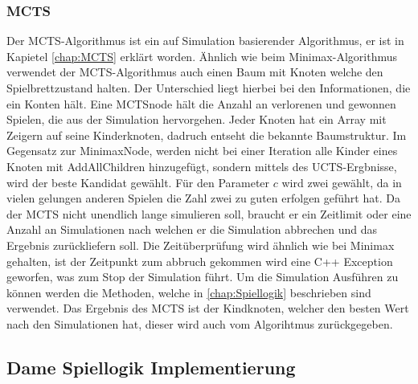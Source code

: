 \documentclass[12pt,a4paper,bibliography=totocnumbered,listof=totocnumbered]{article}
\begin{document}
\subsubsection{MCTS}
Der MCTS-Algorithmus ist ein auf Simulation basierender Algorithmus, er ist in Kapietel \ref{chap:MCTS} erklärt worden.
Ähnlich wie beim Minimax-Algorithmus verwendet der MCTS-Algorithmus auch einen Baum mit Knoten welche den Spielbrettzustand halten.
Der Unterschied liegt hierbei bei den Informationen, die ein Konten hält. Eine MCTSnode hält die Anzahl an verlorenen und gewonnen Spielen,
die aus der Simulation hervorgehen. Jeder Knoten hat ein Array mit Zeigern auf seine Kinderknoten, dadruch entseht die bekannte Baumstruktur.
Im Gegensatz zur MinimaxNode, werden nicht bei einer Iteration alle Kinder eines Knoten mit AddAllChildren hinzugefügt, sondern mittels des 
UCTS-Ergbnisse, wird der beste Kandidat gewählt. Für den Parameter $c$ wird zwei gewählt, da in vielen gelungen anderen Spielen die Zahl zwei 
zu guten erfolgen geführt hat. Da der MCTS nicht unendlich lange simulieren soll, braucht er ein Zeitlimit oder eine Anzahl an Simulationen
nach welchen er die Simulation abbrechen und das Ergebnis zurückliefern soll. Die Zeitüberprüfung wird ähnlich wie bei Minimax gehalten,
ist der Zeitpunkt zum abbruch gekommen wird eine C++ Exception geworfen, was zum Stop der Simulation führt. 
Um die Simulation Ausführen zu können werden die Methoden, welche in \ref{chap:Spiellogik} beschrieben sind verwendet.
Das Ergebnis des MCTS ist der Kindknoten, welcher den besten Wert nach den Simulationen hat, dieser wird auch vom Algorihtmus zurückgegeben.

\subsection{Dame Spiellogik Implementierung}
\end{document}
